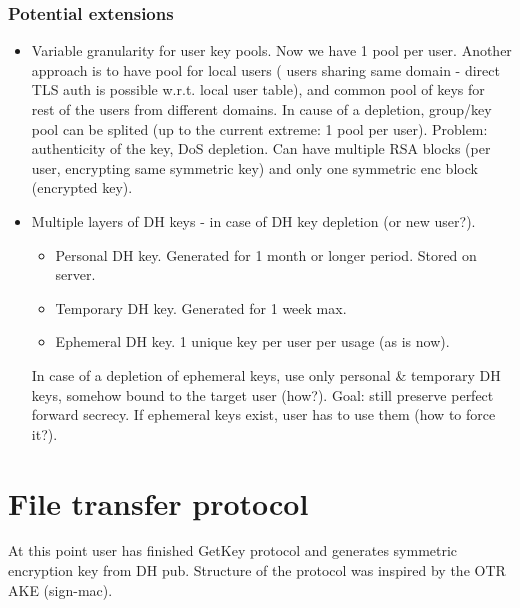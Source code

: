 \documentclass[a4paper,10pt]{article}
\begin{document}
\subsubsection{Potential extensions}
\begin{itemize}
 \item Variable granularity for user key pools. Now we have 1 pool per user. Another approach is to have pool for local users (
    users sharing same domain - direct TLS auth is possible w.r.t. local user table), and common pool of keys for rest of the 
    users from different domains. In cause of a depletion, group/key pool can be splited (up to the current extreme: 1 pool per user). 
    Problem: authenticity of the key, DoS depletion.
    Can have multiple RSA blocks (per user, encrypting same symmetric key) and only one symmetric enc block (encrypted key).
 \item Multiple layers of DH keys - in case of DH key depletion (or new user?).
    \begin{itemize}
     \item Personal DH key. Generated for 1 month or longer period. Stored on server.
     \item Temporary DH key. Generated for 1 week max.
     \item Ephemeral DH key. 1 unique key per user per usage (as is now).
    \end{itemize}
    In case of a depletion of ephemeral keys, use only personal \& temporary DH keys, somehow bound to the target user (how?).
    Goal: still preserve perfect forward secrecy. If ephemeral keys exist, user has to use them (how to force it?).
\end{itemize}


\newpage
\section{File transfer protocol}
At this point user has finished GetKey protocol and generates symmetric encryption key from DH pub.
Structure of the protocol was inspired by the OTR AKE (sign-mac). 
\end{document}
